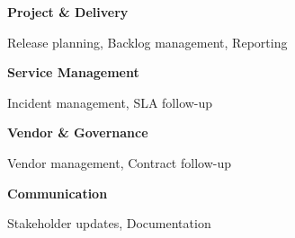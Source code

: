 
\begin{minipage}[t]{0.47\textwidth}
  \raggedright
  \textbf{Project \& Delivery}

  Release planning, Backlog management, Reporting
\end{minipage}
\hfill
\begin{minipage}[t]{0.47\textwidth}
  \raggedright
  \textbf{Service Management}

  Incident management, SLA follow-up
\end{minipage}

\vspace{4mm}

\begin{minipage}[t]{0.47\textwidth}
  \raggedright
  \textbf{Vendor \& Governance}

  Vendor management, Contract follow-up
\end{minipage}
\hfill
\begin{minipage}[t]{0.47\textwidth}
  \raggedright
  \textbf{Communication}

  Stakeholder updates, Documentation
\end{minipage}
